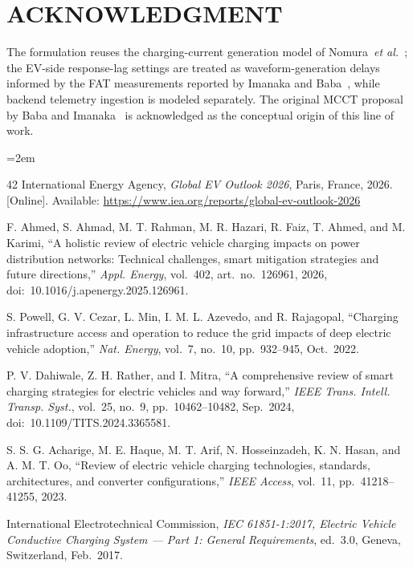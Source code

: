 \documentclass{ieeeaccess}
\newif\ifhighlight \highlightfalse
\DeclareRobustCommand{\revised}[1]{\ifhighlight{\color{blue}#1}\else{\color{.}#1}\fi}
\begin{document}
    \section*{ACKNOWLEDGMENT}
    The formulation reuses the charging-current generation model of Nomura~\textit{et al.}~\cite{b14}; the EV-side response-lag settings are treated as waveform-generation delays informed by the FAT measurements reported by Imanaka and Baba~\cite{bimanaka25}, while backend telemetry ingestion is modeled separately. The original MCCT proposal by Baba and Imanaka~\cite{b13} is acknowledged as the conceptual origin of this line of work.

    \begingroup
    \scriptsize
    \sloppy
    \emergencystretch=2em
    \begin{thebibliography}{42}
    \setlength{\itemsep}{0pt}\setlength{\parsep}{0pt}\setlength{\parskip}{0pt}
                 International Energy Agency, \textit{Global EV Outlook 2026}, Paris, France, 2026. [Online]. Available: \url{https://www.iea.org/reports/global-ev-outlook-2026}

         F. Ahmed, S. Ahmad, M. T. Rahman, M. R. Hazari, R. Faiz, T. Ahmed, and M. Karimi, ``A holistic review of electric vehicle charging impacts on power distribution networks: Technical challenges, smart mitigation strategies and future directions,'' \textit{Appl. Energy}, vol.~402, art.~no.~126961, 2026, doi:~10.1016/j.apenergy.2025.126961.

         S. Powell, G. V. Cezar, L. Min, I. M. L. Azevedo, and R. Rajagopal, ``Charging infrastructure access and operation to reduce the grid impacts of deep electric vehicle adoption,'' \textit{Nat. Energy}, vol.~7, no.~10, pp.~932--945, Oct.~2022.

         P. V. Dahiwale, Z. H. Rather, and I. Mitra, ``A comprehensive review of smart charging strategies for electric vehicles and way forward,'' \textit{IEEE Trans. Intell. Transp. Syst.}, vol.~25, no.~9, pp.~10462--10482, Sep.~2024, doi:~10.1109/TITS.2024.3365581.

         S. S. G. Acharige, M. E. Haque, M. T. Arif, N. Hosseinzadeh, K. N. Hasan, and A. M. T. Oo, ``Review of electric vehicle charging technologies, standards, architectures, and converter configurations,'' \textit{IEEE Access}, vol.~11, pp.~41218--41255, 2023.

         \revised{International Electrotechnical Commission, \textit{IEC 61851-1:2017, Electric Vehicle Conductive Charging System --- Part 1: General Requirements}, ed.~3.0, Geneva, Switzerland, Feb.~2017.}


\end{thebibliography}
\end{document}

